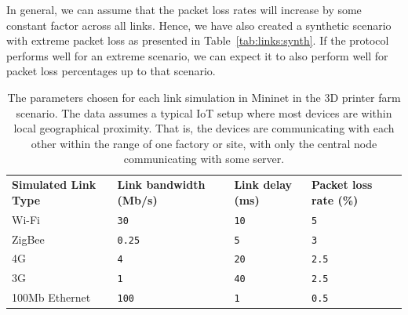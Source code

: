 In general, we can assume that the packet loss rates will increase by some constant factor across all links.
Hence, we have also created a synthetic scenario with extreme packet loss as presented in Table~\ref{tab:links:synth}.
If the protocol performs well for an extreme scenario, we can expect it to also perform well for packet loss percentages up to that scenario.

\begin{table}[ht]
    \caption{The parameters chosen for each link simulation in Mininet in the 3D printer farm scenario. The data assumes a typical IoT setup where most devices are within local geographical proximity. That is, the devices are communicating with each other within the range of one factory or site, with only the central node communicating with some server.}\label{tab:links:3d}
    \begin{tabular}{@{}llll@{}}
        \toprule
        \textbf{Simulated Link Type} & \textbf{Link bandwidth (Mb/s)} & \textbf{Link delay (ms)} & \textbf{Packet loss rate (\%)} \\
        Wi-Fi                        & \texttt{30}                    & \texttt{10}              & \texttt{5}                     \\
        ZigBee                       & \texttt{0.25}                  & \texttt{5}               & \texttt{3}                     \\
        4G                           & \texttt{4}                     & \texttt{20}              & \texttt{2.5}                   \\
        3G                           & \texttt{1}                     & \texttt{40}              & \texttt{2.5}                   \\
        100Mb Ethernet               & \texttt{100}                   & \texttt{1}               & \texttt{0.5}                   \\
        \bottomrule
    \end{tabular}
\end{table}

